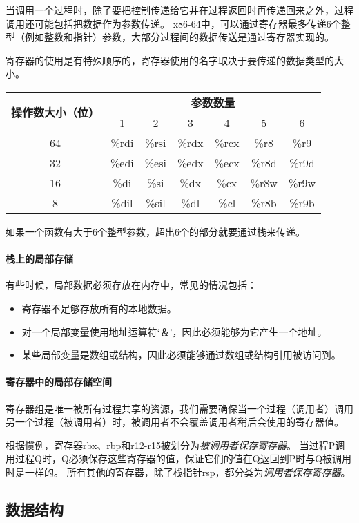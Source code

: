 当调用一个过程时，除了要把控制传递给它并在过程返回时再传递回来之外，过程调用还可能包括把数据作为参数传递。
x86-64中，可以通过寄存器最多传递6个整型（例如整数和指针）参数，大部分过程间的数据传送是通过寄存器实现的。

寄存器的使用是有特殊顺序的，寄存器使用的名字取决于要传递的数据类型的大小。

\begin{table}[H]
    \centering
    \begin{tabular}{|c|c|c|c|c|c|c|}
        \hline
        \multirow{2}{*}{\textbf{操作数大小（位）}} & \multicolumn{6}{c|}{\textbf{参数数量}} \\
        \cline{2-7}
        & 1 & 2 & 3 & 4 & 5 & 6 \\
        \hline
        64 & \%rdi & \%rsi & \%rdx & \%rcx & \%r8 & \%r9 \\
        \hline
        32 & \%edi & \%esi & \%edx & \%ecx & \%r8d & \%r9d \\
        \hline
        16 & \%di & \%si & \%dx & \%cx & \%r8w & \%r9w \\
        \hline
        8 & \%dil & \%sil & \%dl & \%cl & \%r8b & \%r9b \\
        \hline
    \end{tabular}
\end{table}

如果一个函数有大于6个整型参数，超出6个的部分就要通过栈来传递。

\paragraph{栈上的局部存储}

有些时候，局部数据必须存放在内存中，常见的情况包括：
\begin{itemize}
    \item 寄存器不足够存放所有的本地数据。
    \item 对一个局部变量使用地址运算符‘＆’，因此必须能够为它产生一个地址。
    \item 某些局部变量是数组或结构，因此必须能够通过数组或结构引用被访问到。
\end{itemize}

\paragraph{寄存器中的局部存储空间}

寄存器组是唯一被所有过程共享的资源，我们需要确保当一个过程（调用者）调用另一个过程（被调用者）时，被调用者不会覆盖调用者稍后会使用的寄存器值。

根据惯例，寄存器rbx、rbp和r12-r15被划分为\emph{被调用者保存寄存器}。
当过程P调用过程Q时，Q必须保存这些寄存器的值，保证它们的值在Q返回到P时与Q被调用时是一样的。
所有其他的寄存器，除了栈指针rsp，都分类为\emph{调用者保存寄存器}。

\subsection{数据结构}

\newpage
